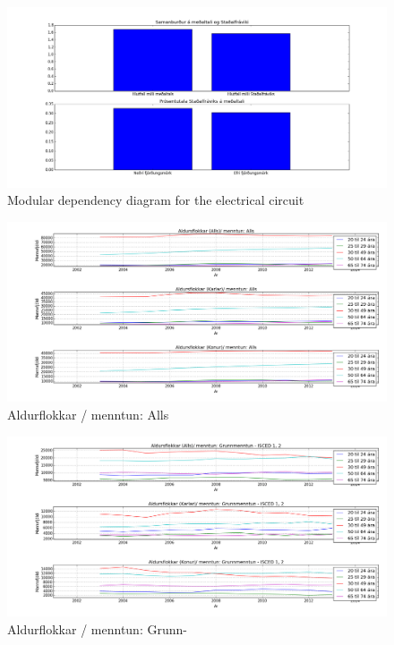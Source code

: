 \documentclass[12pt, svn, draft]{rureport}
\begin{document}
\begin{figure}
	\centering 
	\includegraphics[width=\textwidth]{../graphics/medaltal_stadalfravik_menntun_utan_innan_hs.png}
	\caption{Modular dependency diagram for the electrical circuit \label{fig:stdhs}}
\end{figure}

\begin{figure}
	\centering 
	\includegraphics[width=\textwidth]{../graphics/mentun_aldrusflokkar_alls.png}
	\caption{Aldurflokkar / menntun: Alls \label{fig:menntunall}}
\end{figure}

\begin{figure}
	\centering 
	\includegraphics[width=\textwidth]{../graphics/mentun_aldrusflokkar_grunnmenntun.png}
	\caption{Aldurflokkar / menntun: Grunn- \label{fig:menntungrunn}}
\end{figure}
\end{document}
